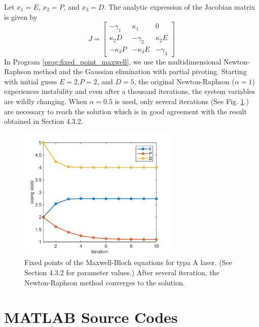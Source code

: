 Let $x_1=E$, $x_2=P$, and $x_3=D$. The analytic expression of the Jacobian matrix  is given by
\begin{equation}
J = 
\begin{bmatrix}
-\gamma_1 & \kappa_1 & 0 \\ \kappa_2 D & -\gamma_2 & \kappa_2 E \\ -\kappa_3 P & -\kappa_3 E & -\gamma_3 \end{bmatrix}
\end{equation}
In Program \ref{prog:fixed_point_maxwell}, we use the multidimensional Newton-Raphson method and the Gaussian elimination with partial pivoting.
Starting with initial guess $E=2$,$P=2$, and $D=5$, the original Newton-Raphson ($\alpha=1$) experiences instability and even after a thousand iterations, the system variables are wildly changing.   When $\alpha=0.5$ is used, only several iterations (See Fig. \ref{fig:fixed_points_maxwell}.) are necessary to reach the solution which is in good agreement with the result obtained in Section 4.3.2.

\begin{figure}
\centering
\includegraphics[width=3in]{09.matrix2/fixed_points_maxwell.pdf}
\caption{Fixed points of the Maxwell-Bloch equations for typa A laser. (See Section 4.3.2 for parameter values.)  After several iteration, the Newton-Raphson method converges to the solution.}\label{fig:fixed_points_maxwell}
\end{figure}

\newpage

\noindent
\section*{MATLAB Source Codes}

